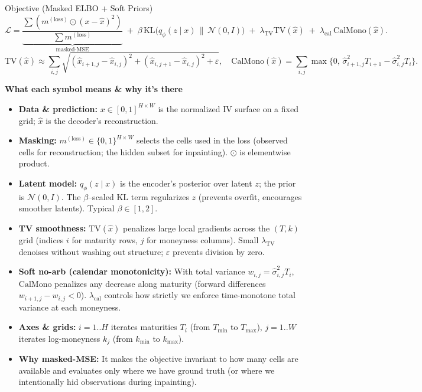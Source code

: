 \documentclass[11pt,aspectratio=169]{beamer}
\newcommand{\KL}{\mathrm{KL}}
\newcommand{\TV}{\mathrm{TV}}
\begin{document}
\begin{frame}{Objective (Masked ELBO + Soft Priors)}
    \small
    \[
        \mathcal{L} =
        \underbrace{\frac{\sum (m^{(\text{loss})}\odot(x-\hat{x})^2)}{\sum m^{(\text{loss})}}}_{\text{masked-MSE}}
        \;+\; \beta\,\KL\!\big(q_\phi(z\!\mid\!x)\,\|\,\mathcal{N}(0,I)\big)
        \;+\; \lambda_{\mathrm{TV}}\TV(\hat{x})
        \;+\; \lambda_{\mathrm{cal}}\,\mathrm{CalMono}(\hat{x}).
    \]
    \vspace{-4pt}
    \[
        \TV(\hat{x}) \approx \sum_{i,j}\sqrt{(\hat{x}_{i+1,j}-\hat{x}_{i,j})^2 + (\hat{x}_{i,j+1}-\hat{x}_{i,j})^2 + \varepsilon},\quad
        \mathrm{CalMono}(\hat{x})=\sum_{i,j} \max\!\{0,\, \hat{\sigma}_{i+1,j}^2 T_{i+1} - \hat{\sigma}_{i,j}^2 T_i\}.
    \]

    \vspace{4pt}
    \textbf{What each symbol means \& why it’s there}
    \begin{itemize}
        \item \textbf{Data \& prediction:} $x\!\in\![0,1]^{H\times W}$ is the normalized IV surface on a fixed grid; $\hat{x}$ is the decoder’s reconstruction.
        \item \textbf{Masking:} $m^{(\mathrm{loss})}\!\in\!\{0,1\}^{H\times W}$ selects the cells used in the loss (observed cells for reconstruction; the hidden subset for inpainting). $\odot$ is elementwise product.
        \item \textbf{Latent model:} $q_\phi(z\!\mid\!x)$ is the encoder’s posterior over latent $z$; the prior is $\mathcal{N}(0,I)$. The $\beta$–scaled $\KL$ term regularizes $z$ (prevents overfit, encourages smoother latents). Typical $\beta\in[1,2]$.
        \item \textbf{TV smoothness:} $\TV(\hat{x})$ penalizes large local gradients across the $(T,k)$ grid (indices $i$ for maturity rows, $j$ for moneyness columns). Small $\lambda_{\mathrm{TV}}$ denoises without washing out structure; $\varepsilon$ prevents division by zero.
        \item \textbf{Soft no-arb (calendar monotonicity):} With total variance $w_{i,j}=\hat{\sigma}_{i,j}^2 T_i$, $\mathrm{CalMono}$ penalizes any decrease along maturity (forward differences $w_{i+1,j}-w_{i,j}<0$). $\lambda_{\mathrm{cal}}$ controls how strictly we enforce time-monotone total variance at each moneyness.
        \item \textbf{Axes \& grids:} $i=1..H$ iterates maturities $T_i$ (from $T_{\min}$ to $T_{\max}$), $j=1..W$ iterates log-moneyness $k_j$ (from $k_{\min}$ to $k_{\max}$).
        \item \textbf{Why masked-MSE:} It makes the objective invariant to how many cells are available and evaluates only where we have ground truth (or where we intentionally hid observations during inpainting).
    \end{itemize}
    \normalsize
\end{frame}
\end{document}
